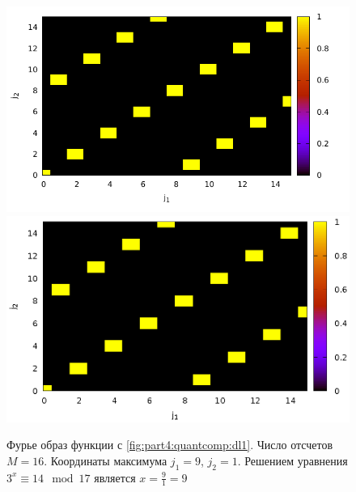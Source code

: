\begin{figure}
\centering

\ifpdf
\includegraphics[angle=0]
{./part4/quantcomp/picdiscretlog2.pdf}
\else
\includegraphics[angle=0]
{./part4/quantcomp/picdiscretlog2.eps}
\fi

%

\caption{Фурье образ функции с \autoref{fig:part4:quantcomp:dl1}.
  Число отсчетов $M=16$. Координаты максимума $j_1 = 9$, $j_2 = 1$. 
Решением уравнения $3^x \equiv 14 \mod 17$
является $x = \frac{9}{1} = 9$} 
\label{fig:part4:quantcomp:dl2}
\end{figure}
